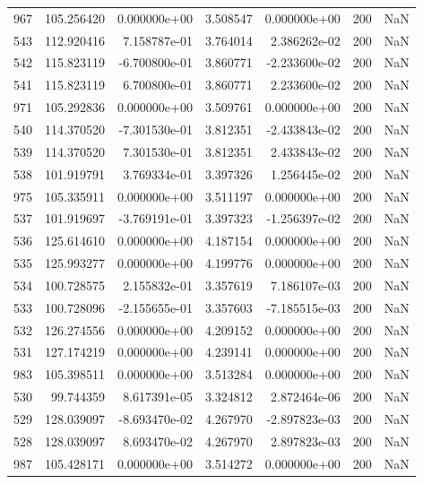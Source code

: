 \begin{tabular}{rrrrrrr}
 967 & 105.256420 &  0.000000e+00 &  3.508547 &  0.000000e+00 &         200 & NaN \\
 543 & 112.920416 &  7.158787e-01 &  3.764014 &  2.386262e-02 &         200 & NaN \\
 542 & 115.823119 & -6.700800e-01 &  3.860771 & -2.233600e-02 &         200 & NaN \\
 541 & 115.823119 &  6.700800e-01 &  3.860771 &  2.233600e-02 &         200 & NaN \\
 971 & 105.292836 &  0.000000e+00 &  3.509761 &  0.000000e+00 &         200 & NaN \\
 540 & 114.370520 & -7.301530e-01 &  3.812351 & -2.433843e-02 &         200 & NaN \\
 539 & 114.370520 &  7.301530e-01 &  3.812351 &  2.433843e-02 &         200 & NaN \\
 538 & 101.919791 &  3.769334e-01 &  3.397326 &  1.256445e-02 &         200 & NaN \\
 975 & 105.335911 &  0.000000e+00 &  3.511197 &  0.000000e+00 &         200 & NaN \\
 537 & 101.919697 & -3.769191e-01 &  3.397323 & -1.256397e-02 &         200 & NaN \\
 536 & 125.614610 &  0.000000e+00 &  4.187154 &  0.000000e+00 &         200 & NaN \\
 535 & 125.993277 &  0.000000e+00 &  4.199776 &  0.000000e+00 &         200 & NaN \\
 534 & 100.728575 &  2.155832e-01 &  3.357619 &  7.186107e-03 &         200 & NaN \\
 533 & 100.728096 & -2.155655e-01 &  3.357603 & -7.185515e-03 &         200 & NaN \\
 532 & 126.274556 &  0.000000e+00 &  4.209152 &  0.000000e+00 &         200 & NaN \\
 531 & 127.174219 &  0.000000e+00 &  4.239141 &  0.000000e+00 &         200 & NaN \\
 983 & 105.398511 &  0.000000e+00 &  3.513284 &  0.000000e+00 &         200 & NaN \\
 530 &  99.744359 &  8.617391e-05 &  3.324812 &  2.872464e-06 &         200 & NaN \\
 529 & 128.039097 & -8.693470e-02 &  4.267970 & -2.897823e-03 &         200 & NaN \\
 528 & 128.039097 &  8.693470e-02 &  4.267970 &  2.897823e-03 &         200 & NaN \\
 987 & 105.428171 &  0.000000e+00 &  3.514272 &  0.000000e+00 &         200 & NaN \\

\end{tabular}
